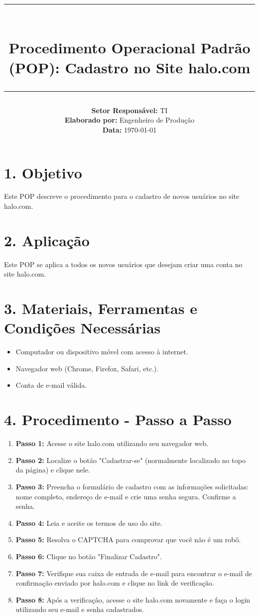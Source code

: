 \documentclass[a4paper,12pt]{article}
\title{
    \vspace{-2cm}
    \rule{\linewidth}{0.5mm}\\[0.4cm]
    \textbf{Procedimento Operacional Padrão (POP): Cadastro no Site halo.com}\\[0.2cm]
    \rule{\linewidth}{0.5mm}
}
\author{
    \textbf{Setor Responsável:} TI \\
    \textbf{Elaborado por:} Engenheiro de Produção \\
    \textbf{Data:} \today
}
\date{}
\begin{document}
\maketitle
\vspace{-1cm}

\section*{1. Objetivo}
Este POP descreve o procedimento para o cadastro de novos usuários no site halo.com.

\section*{2. Aplicação}
Este POP se aplica a todos os novos usuários que desejam criar uma conta no site halo.com.

\section*{3. Materiais, Ferramentas e Condições Necessárias}
\begin{itemize}
    \item Computador ou dispositivo móvel com acesso à internet.
    \item Navegador web (Chrome, Firefox, Safari, etc.).
    \item Conta de e-mail válida.
\end{itemize}

\section*{4. Procedimento - Passo a Passo}
\begin{enumerate}
    \item \textbf{Passo 1:} Acesse o site halo.com utilizando seu navegador web.
    \item \textbf{Passo 2:} Localize o botão "Cadastrar-se" (normalmente localizado no topo da página) e clique nele.
    \item \textbf{Passo 3:} Preencha o formulário de cadastro com as informações solicitadas: nome completo, endereço de e-mail e crie uma senha segura. Confirme a senha.
    \item \textbf{Passo 4:} Leia e aceite os termos de uso do site.
    \item \textbf{Passo 5:} Resolva o CAPTCHA para comprovar que você não é um robô.
    \item \textbf{Passo 6:} Clique no botão "Finalizar Cadastro".
    \item \textbf{Passo 7:} Verifique sua caixa de entrada de e-mail para encontrar o e-mail de confirmação enviado por halo.com e clique no link de verificação.
    \item \textbf{Passo 8:} Após a verificação, acesse o site halo.com novamente e faça o login utilizando seu e-mail e senha cadastrados.
\end{enumerate}
\end{document}
